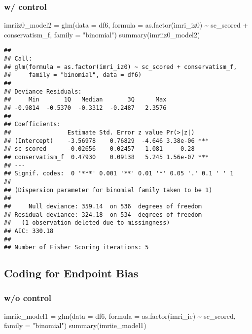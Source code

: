 \documentclass[
]{article}
\newenvironment{Shaded}{\begin{snugshade}}{\end{snugshade}}
\newcommand{\AttributeTok}[1]{\textcolor[rgb]{0.77,0.63,0.00}{#1}}
\newcommand{\FunctionTok}[1]{\textcolor[rgb]{0.00,0.00,0.00}{#1}}
\newcommand{\NormalTok}[1]{#1}
\newcommand{\OtherTok}[1]{\textcolor[rgb]{0.56,0.35,0.01}{#1}}
\newcommand{\SpecialCharTok}[1]{\textcolor[rgb]{0.00,0.00,0.00}{#1}}
\newcommand{\StringTok}[1]{\textcolor[rgb]{0.31,0.60,0.02}{#1}}
\begin{document}
\hypertarget{w-control}{%
\subsubsection{w/ control}\label{w-control}}

\begin{Shaded}
\begin{Highlighting}[]
\NormalTok{imriiz0\_model2 }\OtherTok{=} \FunctionTok{glm}\NormalTok{(}\AttributeTok{data =}\NormalTok{ df6, }\AttributeTok{formula =} \FunctionTok{as.factor}\NormalTok{(imri\_iz0) }\SpecialCharTok{\textasciitilde{}}\NormalTok{ sc\_scored }\SpecialCharTok{+}\NormalTok{ conservatism\_f, }\AttributeTok{family =} \StringTok{"binomial"}\NormalTok{)}
\FunctionTok{summary}\NormalTok{(imriiz0\_model2)}
\end{Highlighting}
\end{Shaded}

\begin{verbatim}
## 
## Call:
## glm(formula = as.factor(imri_iz0) ~ sc_scored + conservatism_f, 
##     family = "binomial", data = df6)
## 
## Deviance Residuals: 
##     Min       1Q   Median       3Q      Max  
## -0.9814  -0.5370  -0.3312  -0.2487   2.3576  
## 
## Coefficients:
##                Estimate Std. Error z value Pr(>|z|)    
## (Intercept)    -3.56978    0.76829  -4.646 3.38e-06 ***
## sc_scored      -0.02656    0.02457  -1.081     0.28    
## conservatism_f  0.47930    0.09138   5.245 1.56e-07 ***
## ---
## Signif. codes:  0 '***' 0.001 '**' 0.01 '*' 0.05 '.' 0.1 ' ' 1
## 
## (Dispersion parameter for binomial family taken to be 1)
## 
##     Null deviance: 359.14  on 536  degrees of freedom
## Residual deviance: 324.18  on 534  degrees of freedom
##   (1 observation deleted due to missingness)
## AIC: 330.18
## 
## Number of Fisher Scoring iterations: 5
\end{verbatim}

\hypertarget{coding-for-endpoint-bias-1}{%
\subsection{Coding for Endpoint Bias}\label{coding-for-endpoint-bias-1}}

\hypertarget{wo-control}{%
\subsubsection{w/o control}\label{wo-control}}

\begin{Shaded}
\begin{Highlighting}[]
\NormalTok{imriie\_model1 }\OtherTok{=} \FunctionTok{glm}\NormalTok{(}\AttributeTok{data =}\NormalTok{ df6, }\AttributeTok{formula =} \FunctionTok{as.factor}\NormalTok{(imri\_ie) }\SpecialCharTok{\textasciitilde{}}\NormalTok{ sc\_scored, }\AttributeTok{family =} \StringTok{"binomial"}\NormalTok{)}
\FunctionTok{summary}\NormalTok{(imriie\_model1)}
\end{Highlighting}
\end{Shaded}
\end{document}
